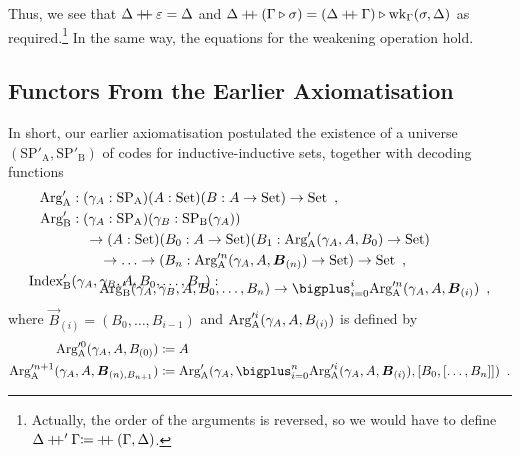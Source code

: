 \documentclass[orivec,envcountsame, ,envcountsect]{llncs}
\begin{document}
Thus, we see that $\Delta \mathbin{+\mkern-6mu+} \varepsilon = \Delta$ and $\Delta
\mathbin{+\mkern-6mu+} (\Gamma \triangleright \sigma) = (\Delta
  \mathbin{+\mkern-6mu+} \Gamma) \triangleright \text{wk}_{\Gamma}(\sigma, \Delta)$ as
required.\footnote{Actually, the order of the arguments is reversed,
  so we would have to define \\$\Delta \mathbin{+\mkern-6mu+}' \Gamma {\coloneqq}
  \mathbin{+\mkern-6mu+}(\Gamma, \Delta)$.} In the same way, the equations for
the weakening operation hold.


\subsection{Functors From the Earlier Axiomatisation} %
\label{sec:functors-CSL-article}

In short, our earlier
axiomatisation\cite{nordvallforsbergSetzer2010indind} postulated the
existence of a universe $(\text{SP}'_{\text{A}}, \text{SP}'_{\text{B}})$
of codes for inductive-inductive sets, together with decoding
functions 
\begin{align*}
\CSLArgA &: (\gamma_A : \text{SP}_{\text{A}})(A : \Set)(B : A \to \Set) \to \Set \enspace ,\\
\CSLArgB &: (\gamma_A : \text{SP}_{\text{A}})(\gamma_B : \text{SP}_{\text{B}}(\gamma_A)) \\
       & \quad \to (A : \Set)(B_0 : A \to \Set)(B_1 : \CSLArgA(\gamma_A, A, B_0) \to \Set) \\
       & \qquad \to \ldots \to (B_n : \CSLArgA^n(\gamma_A, A, \vec{B}_{(n)}) \to \Set) \to \Set \enspace , \\
\CSLIndex&(\gamma_A, \gamma_B, A, B_0, \ldots, B_n) : \\ \noalign{\vskip -4mm}
              &  \qquad \CSLArgB(\gamma_A, \gamma_B, A, B_0, \ldots, B_n) \to \bigplus_{i = 0}^i \CSLArgA^n(\gamma_A, A, \vec{B}_{(i)}) \enspace ,
\end{align*} 
where $\vec{B}_{(i)} = (B_0, \ldots, B_{i - 1})$ and $\text{Arg}_{\text{A}}'^i(\gamma_A, A, B_{(i)})$ is defined by
\begin{align*}
  \CSLArgA^0(\gamma_A, A, B_{(0)}) &\coloneqq A \\
  \CSLArgA^{n + 1}(\gamma_A, A, \vec{B}_{(n), B_{n + 1}}) &\coloneqq \CSLArgA(\gamma_A, \bigplus_{i = 0}^n \CSLArgA^i(\gamma_A, A, \vec{B}_{(i)}), \coprodmorph{B_0}{\coprodmorph{\ldots}{B_n}}) \enspace .
\end{align*}
\end{document}
